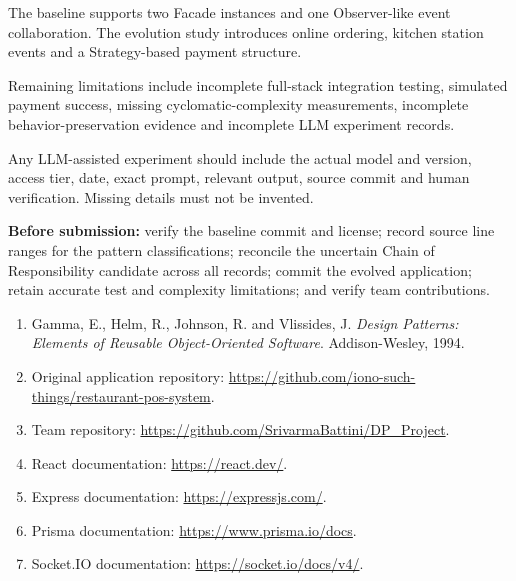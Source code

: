 \documentclass[11pt,a4paper]{article}
\begin{document}
The baseline supports two Facade instances and one Observer-like event collaboration. The evolution study introduces online ordering, kitchen station events and a Strategy-based payment structure.

Remaining limitations include incomplete full-stack integration testing, simulated payment success, missing cyclomatic-complexity measurements, incomplete behavior-preservation evidence and incomplete LLM experiment records.

Any LLM-assisted experiment should include the actual model and version, access tier, date, exact prompt, relevant output, source commit and human verification. Missing details must not be invented.

\textbf{Before submission:} verify the baseline commit and license; record source line ranges for the pattern classifications; reconcile the uncertain Chain of Responsibility candidate across all records; commit the evolved application; retain accurate test and complexity limitations; and verify team contributions.

\begin{enumerate}[leftmargin=*,itemsep=1pt]
\item Gamma, E., Helm, R., Johnson, R. and Vlissides, J.
\textit{Design Patterns: Elements of Reusable Object-Oriented Software}.
Addison-Wesley, 1994.
\item Original application repository:
\url{https://github.com/iono-such-things/restaurant-pos-system}.
\item Team repository:
\url{https://github.com/SrivarmaBattini/DP_Project}.
\item React documentation: \url{https://react.dev/}.
\item Express documentation: \url{https://expressjs.com/}.
\item Prisma documentation: \url{https://www.prisma.io/docs}.
\item Socket.IO documentation: \url{https://socket.io/docs/v4/}.
\end{enumerate}
\end{document}

